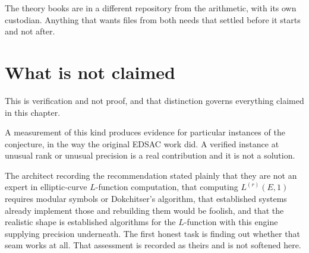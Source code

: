 The theory books are in a different repository from the arithmetic, with its own custodian. Anything
that wants files from both needs that settled before it starts and not after.

\section{What is not claimed}

This is verification and not proof, and that distinction governs everything claimed in this
chapter.

A measurement of this kind produces evidence for particular instances of the conjecture, in the way
the original EDSAC work did. A verified instance at unusual rank or unusual precision is a real
contribution and it is not a solution.

The architect recording the recommendation stated plainly that they are not an expert in
elliptic-curve $L$-function computation, that computing $L^{(r)}(E,1)$ requires modular symbols or
Dokchitser's algorithm, that established systems already implement those and rebuilding them would
be foolish, and that the realistic shape is established algorithms for the $L$-function with this
engine supplying precision underneath. The first honest task is finding out whether that seam works
at all. That assessment is recorded as theirs and is not softened here.
